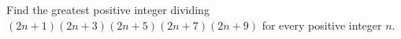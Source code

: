 Find the greatest positive integer dividing $(2n+1)(2n+3)(2n+5)(2n+7)(2n+9)$ for every positive integer $n$.
